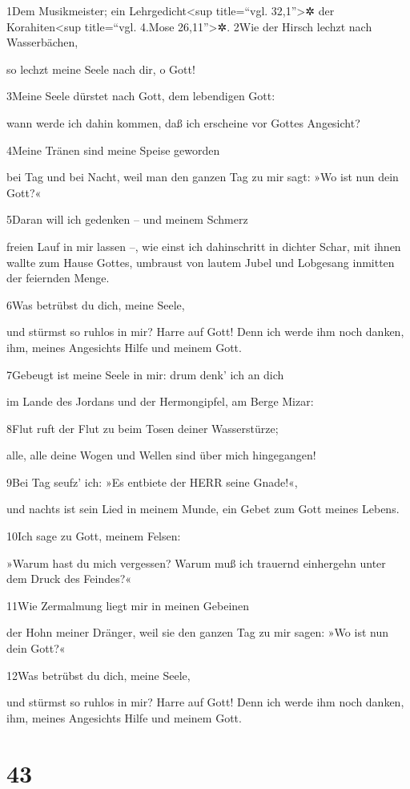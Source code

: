 1Dem Musikmeister; ein Lehrgedicht\textless sup title=``vgl.
32,1''\textgreater✲ der Korahiten\textless sup title=``vgl. 4.Mose
26,11''\textgreater✲. 2Wie der Hirsch lechzt nach Wasserbächen,

so lechzt meine Seele nach dir, o Gott!

3Meine Seele dürstet nach Gott, dem lebendigen Gott:

wann werde ich dahin kommen, daß ich erscheine vor Gottes Angesicht?

4Meine Tränen sind meine Speise geworden

bei Tag und bei Nacht, weil man den ganzen Tag zu mir sagt: »Wo ist nun
dein Gott?«

5Daran will ich gedenken -- und meinem Schmerz

freien Lauf in mir lassen --, wie einst ich dahinschritt in dichter
Schar, mit ihnen wallte zum Hause Gottes, umbraust von lautem Jubel und
Lobgesang inmitten der feiernden Menge.

6Was betrübst du dich, meine Seele,

und stürmst so ruhlos in mir? Harre auf Gott! Denn ich werde ihm noch
danken, ihm, meines Angesichts Hilfe und meinem Gott.

7Gebeugt ist meine Seele in mir: drum denk' ich an dich

im Lande des Jordans und der Hermongipfel, am Berge Mizar:

8Flut ruft der Flut zu beim Tosen deiner Wasserstürze;

alle, alle deine Wogen und Wellen sind über mich hingegangen!

9Bei Tag seufz' ich: »Es entbiete der HERR seine Gnade!«,

und nachts ist sein Lied in meinem Munde, ein Gebet zum Gott meines
Lebens.

10Ich sage zu Gott, meinem Felsen:

»Warum hast du mich vergessen? Warum muß ich trauernd einhergehn unter
dem Druck des Feindes?«

11Wie Zermalmung liegt mir in meinen Gebeinen

der Hohn meiner Dränger, weil sie den ganzen Tag zu mir sagen: »Wo ist
nun dein Gott?«

12Was betrübst du dich, meine Seele,

und stürmst so ruhlos in mir? Harre auf Gott! Denn ich werde ihm noch
danken, ihm, meines Angesichts Hilfe und meinem Gott.

\hypertarget{section-42}{%
\section{43}\label{section-42}}

